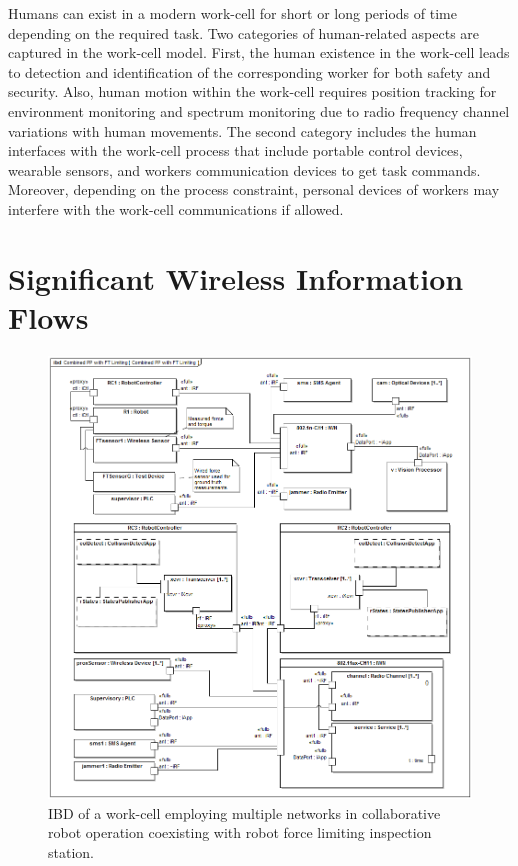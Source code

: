 \documentclass[journal, twoside]{IEEEtran}
\begin{document}
        Humans can exist in a modern work-cell for short or long periods of time depending on the required task. Two categories of human-related aspects are captured in the work-cell model. First, the human existence in the work-cell leads to detection and identification of the corresponding worker for both safety and security. Also, human motion within the work-cell requires position tracking for environment monitoring and spectrum monitoring due to radio frequency channel variations with human movements. The second category includes the human interfaces with the work-cell process that include portable control devices, wearable sensors, and workers communication devices to get task commands. Moreover, depending on the process constraint, personal devices of workers may interfere with the work-cell communications if allowed.      
	
	\section{Significant Wireless Information Flows}\label{sec:wireless-infoflows}
	\begin{figure}[tbp]
		\centering
		\includegraphics[width=\textwidth]{diagrams/ibd__Combined_PP_with_FT_Limiting__Combined_PP_with_FT_Limiting}
		\caption{IBD of a work-cell employing multiple networks in collaborative robot operation coexisting with robot force limiting inspection station.}
		\label{fig:workcell:examples}     
	\end{figure}
	
\end{document}
